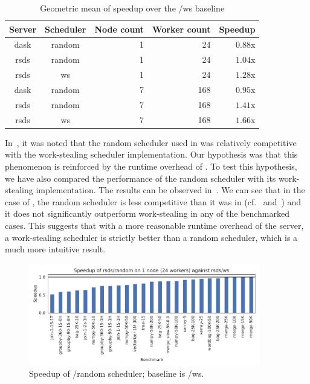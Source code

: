 \setlength{\tabcolsep}{5pt}
\begin{table}
	\centering
	\begin{tabular}{c|c|r|r|r}
		\textbf{Server} & \textbf{Scheduler} & \textbf{Node count} & \textbf{Worker	count} &
		\textbf{Speedup}                                                                                 \\
		\midrule
		dask            & random             & 1                   & 24                   &
		$0.88$x \\
		rsds            & random             & 1                   & 24                   &
		$1.04$x \\
		rsds            & ws                 & 1                   & 24                   &
		$1.28$x \\
		dask            & random             & 7                   & 168                  &
		$0.95$x \\
		rsds            & random             & 7                   & 168                  &
		$1.41$x \\
		rsds            & ws                 & 7                   & 168                  &
		$1.66$x \\
	\end{tabular}
	\caption{Geometric mean of speedup over the \dask{}/ws baseline}
	\label{tab:rsds-geom-mean-speedup}
\end{table}

In~, it was noted that the random scheduler used in
\dask{} was relatively competitive with the work-stealing scheduler
implementation. Our hypothesis was that this phenomenon is reinforced by the runtime overhead of
\dask{}. To test this hypothesis, we have also compared the performance of the
\rsds{} random scheduler with its work-stealing implementation. The results can
be observed in~. We can see that in the case of
\rsds{}, the random scheduler is less competitive than it was in
\dask{} (cf.~ and~) and it does not significantly outperform work-stealing in any of the
benchmarked cases. This suggests that with a more reasonable runtime overhead of the server, a
work-stealing scheduler is strictly better than a random scheduler, which is a much more intuitive
result.

\begin{figure}
	\centering
	\includegraphics[width=0.9\textwidth]{./imgs/rsds/charts/speedup-rsds-random-1-baseline-rsds-ws}
	\caption{Speedup of \rsds{}/random scheduler; baseline is \rsds{}/ws.}
	\label{fig:rsds-random-baseline}
\end{figure}

